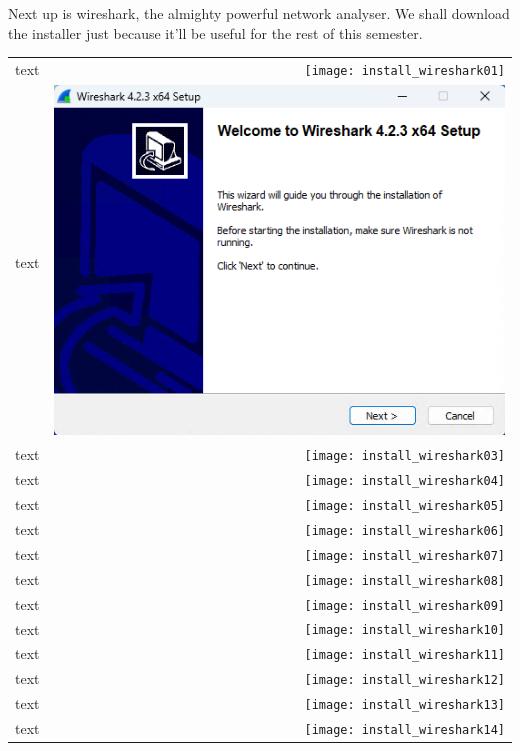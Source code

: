 \documentclass[11pt,a4paper]{report}
\begin{document}
        Next up is wireshark, the almighty powerful network analyser.
        We shall download the installer just because it'll be useful for the rest of this semester.
        \begin{tabular}{ l r }
            text & \texttt{[image: install\_wireshark01]} \\
            text & \includegraphics[scale=1.0]{install_wireshark02} \\
            text & \texttt{[image: install\_wireshark03]} \\
            text & \texttt{[image: install\_wireshark04]} \\
            text & \texttt{[image: install\_wireshark05]} \\
            text & \texttt{[image: install\_wireshark06]} \\
            text & \texttt{[image: install\_wireshark07]} \\
            text & \texttt{[image: install\_wireshark08]} \\
            text & \texttt{[image: install\_wireshark09]} \\
            text & \texttt{[image: install\_wireshark10]} \\
            text & \texttt{[image: install\_wireshark11]} \\
            text & \texttt{[image: install\_wireshark12]} \\
            text & \texttt{[image: install\_wireshark13]} \\
            text & \texttt{[image: install\_wireshark14]} \\

\end{tabular}
\end{document}
